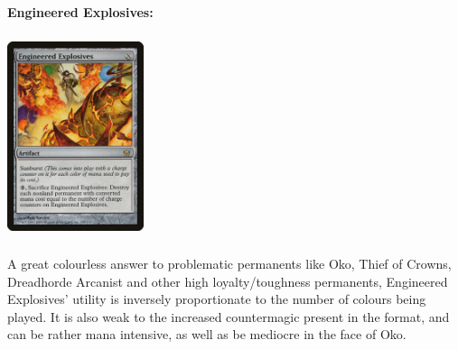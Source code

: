 \documentclass{report}
\begin{document}
\textbf{Engineered Explosives:}
\begin{center}
\includegraphics [width = 4cm, height = 6cm] {engineered-explosives}
\end{center}
A great colourless answer to problematic permanents like Oko, Thief of Crowns, Dreadhorde Arcanist and other high loyalty/toughness permanents, Engineered Explosives' utility is inversely proportionate to the number of colours being played. It is also weak to the increased countermagic present in the format, and can be rather mana intensive, as well as be mediocre in the face of Oko.\\\\
\end{document}
